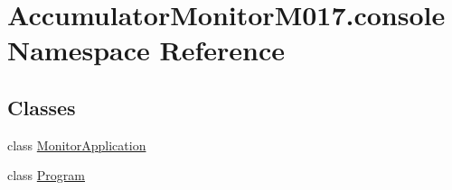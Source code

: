 \hypertarget{namespace_accumulator_monitor_m017_1_1console}{}\section{Accumulator\+Monitor\+M017.\+console Namespace Reference}
\label{namespace_accumulator_monitor_m017_1_1console}
\subsection*{Classes}
\begin{DoxyCompactItemize}
\item 
class \hyperlink{class_accumulator_monitor_m017_1_1console_1_1_monitor_application}{Monitor\+Application}
\item 
class \hyperlink{class_accumulator_monitor_m017_1_1console_1_1_program}{Program}
\end{DoxyCompactItemize}
